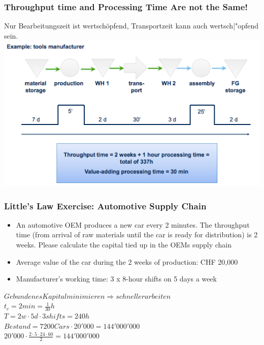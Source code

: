 \subsubsection{Throughput time and Processing Time Are not the Same!}
Nur Bearbeitungszeit ist wertsch\"opfend, Transportzeit kann auch wertsch|"opfend sein.\\
\includegraphics[width=1\textwidth]{W04/troughputvsprocessing}
\subsubsection{Little's Law Exercise: Automotive Supply Chain}
\begin{itemize}
\item An automotive OEM produces a new car every 2
minutes. The throughput time (from arrival of raw
materials until the car is ready for distribution) is 2
weeks. Please calculate the capital tied up in the
OEMs supply chain
\item Average value of the car during the 2 weeks of
production: CHF 20,000
\item Manufacturer's working time: 3 x 8-hour shifts on 5
days a week
\end{itemize}
\begin{center}
	
$Gebundenes Kapital minimieren \Longrightarrow schneller arbeiten$\\
$t_c = 2min =\frac{1}{30}h$\\
$T = 2w \cdot 5d \cdot 3 shifts = 240h$\\
$Bestand = 7200 Cars \cdot 20'000 = 144'000'000$\\ \vspace{2mm}
$20'000 \cdot \frac{2 \cdot 5 \cdot 24 \cdot 60}{2}=144'000'000$
\end{center}

